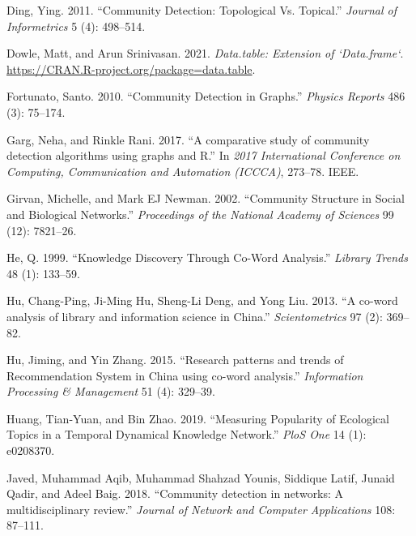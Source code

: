 \begin{CSLReferences}{1}{0}
\leavevmode{}%
Ding, Ying. 2011. {``Community Detection: Topological Vs. Topical.''} \emph{Journal of Informetrics} 5 (4): 498--514.

\leavevmode{}%
Dowle, Matt, and Arun Srinivasan. 2021. \emph{Data.table: Extension of `Data.frame`}. \url{https://CRAN.R-project.org/package=data.table}.

\leavevmode{}%
Fortunato, Santo. 2010. {``Community Detection in Graphs.''} \emph{Physics Reports} 486 (3): 75--174.

\leavevmode{}%
Garg, Neha, and Rinkle Rani. 2017. {``{A comparative study of community detection algorithms using graphs and R}.''} In \emph{2017 International Conference on Computing, Communication and Automation (ICCCA)}, 273--78. IEEE.

\leavevmode{}%
Girvan, Michelle, and Mark EJ Newman. 2002. {``Community Structure in Social and Biological Networks.''} \emph{Proceedings of the National Academy of Sciences} 99 (12): 7821--26.

\leavevmode{}%
He, Q. 1999. {``Knowledge Discovery Through Co-Word Analysis.''} \emph{Library Trends} 48 (1): 133--59.

\leavevmode{}%
Hu, Chang-Ping, Ji-Ming Hu, Sheng-Li Deng, and Yong Liu. 2013. {``{A co-word analysis of library and information science in China}.''} \emph{Scientometrics} 97 (2): 369--82.

\leavevmode{}%
Hu, Jiming, and Yin Zhang. 2015. {``{Research patterns and trends of Recommendation System in China using co-word analysis}.''} \emph{Information Processing \& Management} 51 (4): 329--39.

\leavevmode{}%
Huang, Tian-Yuan, and Bin Zhao. 2019. {``Measuring Popularity of Ecological Topics in a Temporal Dynamical Knowledge Network.''} \emph{PloS One} 14 (1): e0208370.

\leavevmode{}%
Javed, Muhammad Aqib, Muhammad Shahzad Younis, Siddique Latif, Junaid Qadir, and Adeel Baig. 2018. {``{Community detection in networks: A multidisciplinary review}.''} \emph{Journal of Network and Computer Applications} 108: 87--111.


\end{CSLReferences}
